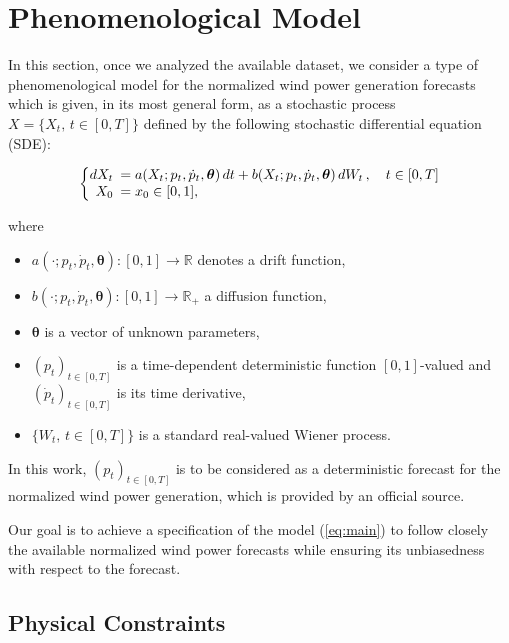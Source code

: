 \documentclass[11pt]{article}
\theoremstyle{definition}
\begin{document}
\section{Phenomenological  Model} \label{Section_2}

In this section, once we analyzed the available dataset, we consider a type of phenomenological model for the normalized wind power generation forecasts which is given, in its most general form, as a stochastic process $X = \{X_t, \, t \in [0,T] \}$  defined by the following stochastic differential equation (SDE):

\begin{equation}
  \left\{
  \begin{array}{@{}rl@{}}
    dX_t \!\!\!&=  a(X_t; p_t, \dot{p}_t,\bm{\theta}) \,dt + b (X_t; p_t, \dot{p}_t, \bm{\theta} ) \,dW_t\,, \quad t \in [0,T]  \\
     X_0  \!\!\!&=  x_0 \in [0,1],
  \end{array}\right. \label{eq:main}
\end{equation} 

where

\begin{itemize}
\item $a(\cdot; p_t, \dot{p}_t, \bm{\theta}): [0,1] \to \mathbb{R} $  denotes a drift function,
\item $b(\cdot; p_t, \dot{p}_t, \bm{\theta}): [0,1] \to \mathbb{R}_+ $  a  diffusion function,
\item $\bm{\theta}$ is a vector of unknown parameters,
\item $(p_t)_{t \in [0,T]}$ is a time-dependent deterministic function $[0,1]$-valued and $ (\dot{p}_t)_{t \in [0,T]}$ is its time derivative,
\item $\{W_t, \, t \in [0,T] \}$ is a standard real-valued Wiener process.
\end{itemize}

In this work, $(p_t)_{t \in [0,T]}$ is to be considered as a deterministic forecast for the normalized wind power generation, which is provided by an official source. 

Our goal is to achieve a specification of the model (\ref{eq:main}) to follow closely the available normalized wind power forecasts while ensuring its unbiasedness with respect to the forecast. 

\subsection{Physical Constraints}
\end{document}
